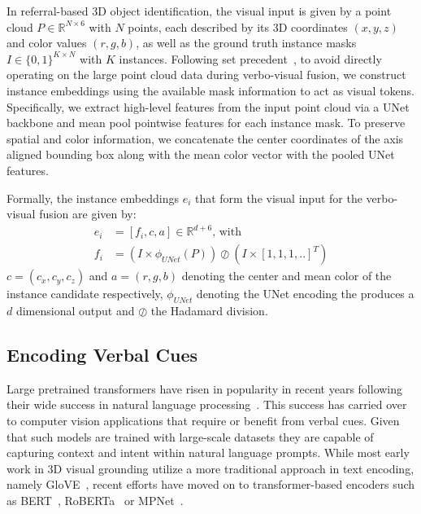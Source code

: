 \documentclass[10pt,twocolumn,letterpaper]{article}
\begin{document}
In referral-based 3D object identification, the visual input is given by a point cloud $P \in \mathbb{R}^{N\times6}$ with $N$ points, each described by its 3D coordinates $(x,y,z)$ and color values $(r,g,b)$, as well as the ground truth instance masks $I \in \{0,1\}^{K\times N}$ with $K$ instances. Following set precedent~\cite{unal2023ways, zhao2021_3DVG_Transformer, jain2022bottom}, to avoid directly operating on the large point cloud data during verbo-visual fusion, we construct instance embeddings using the available mask information to act as visual tokens. Specifically, we extract high-level features from the input point cloud via a UNet backbone and mean pool pointwise features for each instance mask.
To preserve spatial and color information, we concatenate the center coordinates of the axis aligned bounding box along with the mean color vector with the pooled UNet features.

Formally, the instance embeddings $e_i$ that form the visual input for the verbo-visual fusion are given by:
\begin{equation}
\begin{split}    
    e_i &= [f_i,c,a] \in \mathbb{R}^{d+6} \textrm{, \ with} \\
    f_i &= (I \times \phi_{UNet}(P)) \oslash (I \times [1,1,1,..]^T)
\end{split}
\end{equation}
$c = (c_x,c_y,c_z)$ and  $a = (r,g,b)$ denoting the center and mean color of the instance candidate respectively, $\phi_{UNet}$ denoting the UNet encoding the produces a $d$ dimensional output and $\oslash$ the Hadamard division.

\subsection{Encoding Verbal Cues}
\label{subsection:Ver}

Large pretrained transformers have risen in popularity in recent years following their wide success in natural language processing~\cite{vaswani2017attention, liu2019roberta, song2020mpnet}. This success has carried over to computer vision applications that require or benefit from verbal cues. Given that such models are trained with large-scale datasets they are capable of capturing context and intent within natural language prompts. While most early work in 3D visual grounding utilize a more traditional approach in text encoding, namely GloVE~\cite{pennington2014glove}, recent efforts have moved on to transformer-based encoders such as BERT~\cite{devlin2018bert}, RoBERTa~\cite{liu2019roberta} or MPNet~\cite{song2020mpnet}.
\end{document}
